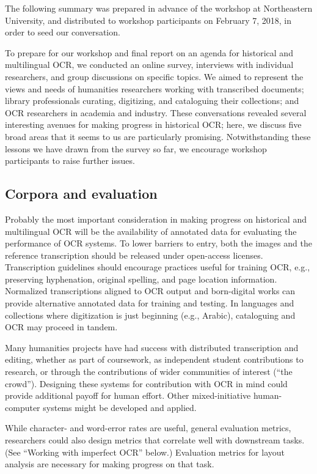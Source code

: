 \documentclass[twoside,11pt]{report}
\begin{document}
The following summary was prepared in advance of the workshop at Northeastern University, and distributed to workshop participants on February 7, 2018, in order to seed our conversation.

To prepare for our workshop and final report on an agenda for historical and multilingual OCR, we conducted an online survey, interviews with individual researchers, and group discussions on specific topics. We aimed to represent the views and needs of humanities researchers working with transcribed documents; library professionals curating, digitizing, and cataloguing their collections; and OCR researchers in academia and industry. These conversations revealed several interesting avenues for making progress in historical OCR; here, we discuss five broad areas that it seems to us are particularly promising. Notwithstanding these lessons we have drawn from the survey so far, we encourage workshop participants to raise further issues.

\subsection{Corpora and evaluation}

Probably the most important consideration in making progress on historical and multilingual OCR will be the availability of annotated data for evaluating the performance of OCR systems. To lower barriers to entry, both the images and the reference transcription should be released  under open-access licenses. Transcription guidelines should encourage practices useful for training OCR, e.g., preserving hyphenation, original spelling, and page location information. Normalized transcriptions aligned to OCR output and born-digital works can provide alternative annotated data for training and testing. In languages and collections where digitization is just beginning (e.g., Arabic), cataloguing and OCR may proceed in tandem.

Many humanities projects have had success with distributed transcription and editing, whether as part of coursework, as independent student contributions to research, or through the contributions of wider communities of interest (``the crowd''). Designing these systems for contribution with OCR in mind could provide additional payoff for human effort. Other mixed-initiative human-computer systems might be developed and applied.

While character- and word-error rates are useful, general evaluation metrics, researchers could also design metrics that correlate well with downstream tasks. (See ``Working with imperfect OCR'' below.) Evaluation metrics for layout analysis are necessary for making progress on that task.
\end{document}
